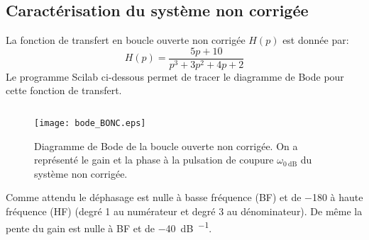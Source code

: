 \subsection*{Caractérisation du système non corrigée}
La fonction de transfert en boucle ouverte non corrigée $H(p)$ est donnée par:
\[
    H(p)=\dfrac{5p+10}{p^3+3p^2+4p+2}
\]
Le programme Scilab ci-dessous permet de tracer le diagramme de Bode pour cette
fonction de transfert.
\inputminted{scilab}{codes/scilab/code_q1_chap_correction.sce}
\begin{figure}
    \centering
    \texttt{[image: bode\_BONC.eps]}
    \caption{Diagramme de Bode de la boucle ouverte non corrigée. 
             On a représenté le gain et la phase à la pulsation de coupure 
             $\omega_{\SI{0}{\dB}}$ du système non corrigée.}
\end{figure}
Comme attendu le déphasage est nulle à basse fréquence (BF) et de 
\SI{-180}{\degreeSI} à haute fréquence (HF) (degré 1 au numérateur et 
degré 3 au dénominateur). De même la pente du gain est nulle à BF et 
de \SI{-40}{\dB\per\dec}.

